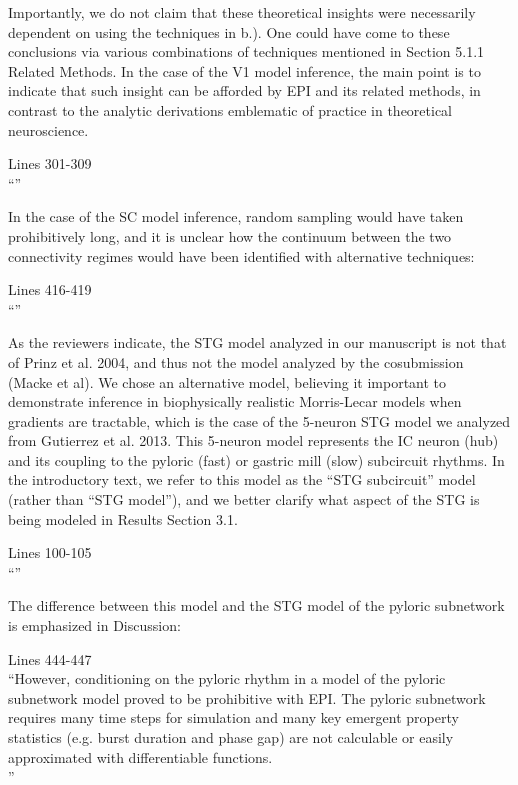 \documentclass[11pt,a4paper]{article}
\begin{document}
Importantly, we do not claim that these theoretical insights were necessarily dependent on using the techniques in b.).  
One could have come to these conclusions via various combinations of techniques mentioned in Section 5.1.1 Related Methods.
In the case of the V1 model inference, the main point is to indicate that such insight can be afforded by EPI and its related methods, in contrast to the analytic derivations emblematic of practice in theoretical neuroscience.
\begin{displayquote}
Lines 301-309 \\
``''
\end{displayquote}
In the case of the SC model inference, random sampling would have taken prohibitively long, and it is unclear how the continuum between the two connectivity regimes would have been identified with alternative techniques:
\begin{displayquote}
Lines 416-419 \\
``''
\end{displayquote}
 
As the reviewers indicate, the STG model analyzed in our manuscript is not that of Prinz et al. 2004, and thus not the model analyzed by the cosubmission (Macke et al).  We chose an alternative model, believing it important to demonstrate inference in biophysically realistic Morris-Lecar models when gradients are tractable, which is the case of the 5-neuron STG model we analyzed from Gutierrez et al. 2013.  This 5-neuron model represents the IC neuron (hub) and its coupling to the pyloric (fast) or gastric mill (slow) subcircuit rhythms.  In the introductory text, we refer to this model as the “STG subcircuit” model (rather than “STG model”), and we better clarify what aspect of the STG is being modeled in Results Section 3.1. 

\begin{displayquote}
Lines 100-105 \\
``''
\end{displayquote}

The difference between this model and the STG model of the pyloric subnetwork is emphasized in Discussion:

\begin{displayquote}
Lines 444-447 \\
``However, conditioning on the pyloric rhythm \cite{marder1992dynamic} in a model of the pyloric subnetwork model \cite{prinz2004similar} proved to be prohibitive with EPI.
The pyloric subnetwork requires many time steps for simulation and many key emergent property statistics (e.g. burst duration and phase gap) are not calculable or easily approximated with differentiable functions.\\
''
\end{displayquote}
\end{document}
